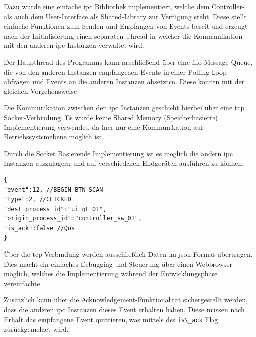 Dazu wurde eine einfache \gls{ipc} Bibliothek implementiert, welche dem
Controller- als auch dem User-Interface als Shared-Library zur Verfügung
steht. Diese stellt einfache Funktionen zum Senden und Empfangen von
Events bereit und erzeugt nach der Initialisierung einen separaten
Thread in welcher die Kommunikation mit den anderen \gls{ipc} Instanzen
verwaltet wird.

Der Haupthread des Programms kann anschließend über eine \gls{fifo}
Message Queue, die von den anderen Instanzen empfangenen Events in einer
Polling-Loop abfragen und Events an die anderen Instanzen absetzten.
Diese können mit der gleichen Vorgehensweise

Die Kommunikation zwischen den \gls{ipc} Instanzen geschieht hierbei
über eine \gls{tcp} Socket-Verbindung. Es wurde keine Shared Memory
(Speicherbasierte) Implementierung verwendet, da hier nur eine
Kommunikation auf Betriebssystemebene möglich ist.

Durch die Socket Basierende Implementierung ist es möglich die andern
\gls{ipc} Instanzen auszulagern und auf verschiedenen Endgeräten
ausführen zu können.

\begin{lstlisting}
{
"event":12, //BEGIN_BTN_SCAN
"type":2, //CLICKED
"dest_process_id":"ui_qt_01",
"origin_process_id":"controller_sw_01",
"is_ack":false //Qos
}
\end{lstlisting}

Über die \gls{tcp} Verbindung werden ausschließlich Daten im \gls{json}
Format übertragen. Dies macht ein einfaches Debugging und Steuerung über
einen Webbrowser möglich, welches die Implementierung während der
Entwicklungsphase vereinfachte.

Zusätzlich kann über die Acknowledgement-Funktionalität sichergestellt
werden, dass die anderen \gls{ipc} Instanzen dieses Event erhalten
haben. Diese müssen nach Erhalt das empfangene Event quittieren, was
mittels des \passthrough{\lstinline!is\_ack!} Flag zurückgemeldet wird.

